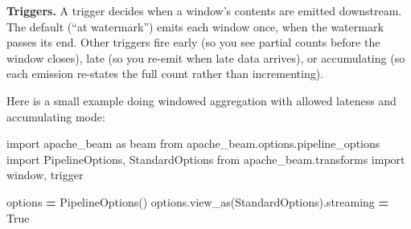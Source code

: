 \documentclass[
  11pt,
  british,
  oneside]{book}
\newenvironment{Shaded}{\begin{snugshade}}{\end{snugshade}}
\newcommand{\ImportTok}[1]{#1}
\newcommand{\NormalTok}[1]{#1}
\newcommand{\OperatorTok}[1]{\textcolor[rgb]{0.81,0.36,0.00}{\textbf{#1}}}
\newcommand{\VariableTok}[1]{\textcolor[rgb]{0.00,0.00,0.00}{#1}}
\begin{document}
\textbf{Triggers.} A trigger decides when a window's contents are
emitted downstream. The default (``at watermark'') emits each window
once, when the watermark passes its end. Other triggers fire early (so
you see partial counts before the window closes), late (so you re-emit
when late data arrives), or accumulating (so each emission re-states the
full count rather than incrementing).

Here is a small example doing windowed aggregation with allowed lateness
and accumulating mode:

\begin{Shaded}
\begin{Highlighting}[]
\ImportTok{import}\NormalTok{ apache\_beam }\ImportTok{as}\NormalTok{ beam}
\ImportTok{from}\NormalTok{ apache\_beam.options.pipeline\_options }\ImportTok{import}\NormalTok{ PipelineOptions, StandardOptions}
\ImportTok{from}\NormalTok{ apache\_beam.transforms }\ImportTok{import}\NormalTok{ window, trigger}

\NormalTok{options }\OperatorTok{=}\NormalTok{ PipelineOptions()}
\NormalTok{options.view\_as(StandardOptions).streaming }\OperatorTok{=} \VariableTok{True}


\end{Highlighting}
\end{Shaded}
\end{document}

